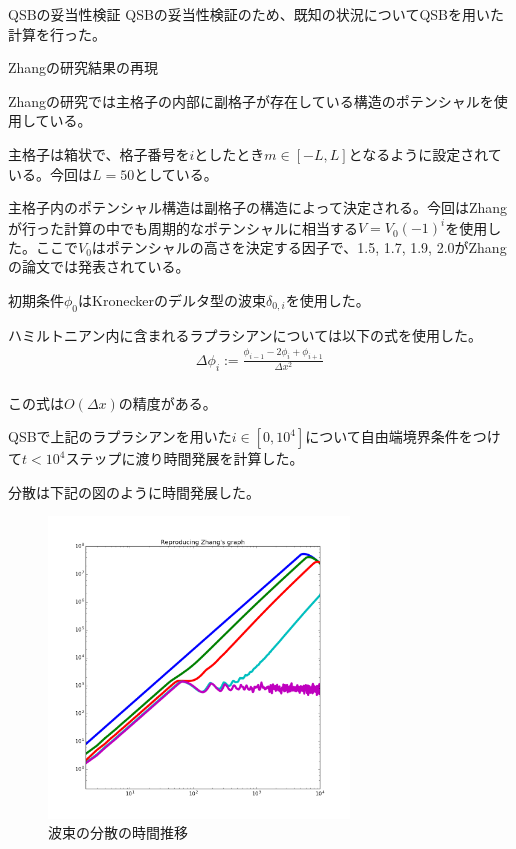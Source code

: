 \documentclass[a4paper, lualatex]{bxjsarticle}
\begin{document}
\begin{section}{QSBの妥当性検証}
    QSBの妥当性検証のため、既知の状況についてQSBを用いた計算を行った。
    \begin{subsection}{Zhangの研究結果の再現}
        \par Zhangの研究では主格子の内部に副格子が存在している構造のポテンシャルを使用している。
        \par 主格子は箱状で、格子番号を$i$としたとき$m\in [-L, L]$となるように設定されている。今回は$L=50$としている。
        \par 主格子内のポテンシャル構造は副格子の構造によって決定される。今回はZhangが行った計算の中でも周期的なポテンシャルに相当する$V=V_0 (-1)^i$を使用した。ここで$V_0$はポテンシャルの高さを決定する因子で、1.5, 1.7, 1.9, 2.0がZhangの論文では発表されている。
        \par 初期条件$\phi_0$はKroneckerのデルタ型の波束$\delta_{0,i}$を使用した。
        \par ハミルトニアン内に含まれるラプラシアンについては以下の式を使用した。
        \begin{align}
         \Delta \phi_i := \frac{\phi_{i-1} - 2\phi_{i} + \phi_{i+1}}{\varDelta x^2}\nonumber\\
        \end{align}
        \par この式は$O(\varDelta x)$の精度がある。
        \par QSBで上記のラプラシアンを用いた$i\in [0, 10^4]$について自由端境界条件をつけて$t<10^4$ステップに渡り時間発展を計算した。
        \par 分散は下記の図のように時間発展した。
         \begin{figure}[h]
            \centering
            \includegraphics[width=8cm]{zhang.png}
            \caption{波束の分散の時間推移}

\end{figure}
\end{subsection}
\end{section}
\end{document}
